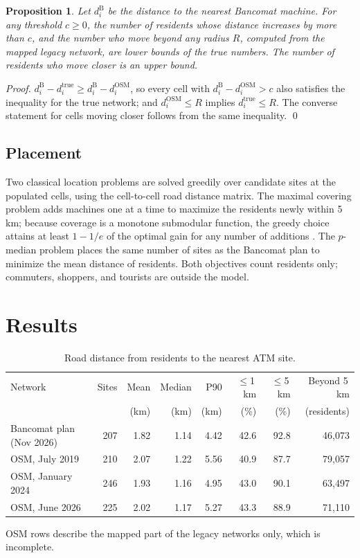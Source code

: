 \documentclass[11pt]{article}
\newtheorem{proposition}{Proposition}
\begin{document}
\begin{proposition}
Let $d^{\mathrm{B}}_i$ be the distance to the nearest Bancomat machine. For any threshold $c \ge 0$, the number of residents whose distance increases by more than $c$, and the number who move beyond any radius $R$, computed from the mapped legacy network, are lower bounds of the true numbers. The number of residents who move closer is an upper bound.
\end{proposition}

\noindent\emph{Proof.} $d^{\mathrm{B}}_i - d^{\mathrm{true}}_i \ge d^{\mathrm{B}}_i - d^{\mathrm{OSM}}_i$, so every cell with $d^{\mathrm{B}}_i - d^{\mathrm{OSM}}_i > c$ also satisfies the inequality for the true network; and $d^{\mathrm{OSM}}_i \le R$ implies $d^{\mathrm{true}}_i \le R$. The converse statement for cells moving closer follows from the same inequality. \qed

\subsection{Placement}
Two classical location problems are solved greedily over candidate sites at the populated cells, using the cell-to-cell road distance matrix. The maximal covering problem \citep{church1974} adds machines one at a time to maximize the residents newly within 5\,km; because coverage is a monotone submodular function, the greedy choice attains at least $1-1/e$ of the optimal gain for any number of additions \citep{nemhauser1978}. The $p$-median problem \citep{hakimi1964} places the same number of sites as the Bancomat plan to minimize the mean distance of residents. Both objectives count residents only; commuters, shoppers, and tourists are outside the model.

\section{Results}
\begin{table}[t]
\centering\small
\caption{Road distance from residents to the nearest ATM site.}
\label{tab:coverage}
\begin{tabular}{lrrrrrrr}
\toprule
Network & Sites & Mean & Median & P90 & $\le$1\,km & $\le$5\,km & Beyond 5\,km \\
 & & (km) & (km) & (km) & (\%) & (\%) & (residents) \\
\midrule
Bancomat plan (Nov 2026) & 207 & 1.82 & 1.14 & 4.42 & 42.6 & 92.8 & 46,073 \\
OSM, July 2019 & 210 & 2.07 & 1.22 & 5.56 & 40.9 & 87.7 & 79,057 \\
OSM, January 2024 & 246 & 1.93 & 1.16 & 4.95 & 43.0 & 90.1 & 63,497 \\
OSM, June 2026 & 225 & 2.02 & 1.17 & 5.27 & 43.3 & 88.9 & 71,110 \\
\bottomrule
\end{tabular}
\par\smallskip\footnotesize OSM rows describe the mapped part of the legacy networks only, which is incomplete.
\end{table}
\end{document}
